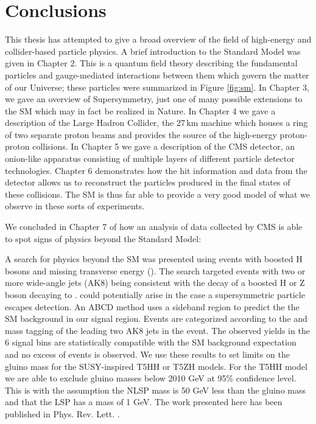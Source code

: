 \chapter{Conclusions}
\label{chap:conclusions}

This thesis has attempted to give a broad overview of the field of high-energy and collider-based particle physics. A brief introduction to the Standard Model was given in Chapter 2. This is a quantum field theory describing the fundamental particles and gauge-mediated interactions between them which govern the matter of our Universe; these particles were summarized in Figure \ref{fig:sm}. In Chapter 3, we gave an overview of Supersymmetry, just one of many possible extensions to the SM which may in fact be realized in Nature. In Chapter 4 we gave a description of the Large Hadron Collider, the 27$\,$km machine which houses a ring of two separate proton beams and provides the source of the high-energy proton-proton collisions. In Chapter 5 we gave a description of the CMS detector, an onion-like apparatus consisting of multiple layers of different particle detector technologies. Chapter 6 demonstrates how the hit information and data from the detector allows us to reconstruct the particles produced in the final states of these collisions. The SM is thus far able to provide a very good model of what we observe in these sorts of experiments.

We concluded in Chapter 7 of how an analysis of data collected by CMS is able to spot signs of physics beyond the Standard Model:

A search for physics beyond the SM was presented using events with boosted H bosons and missing transverse energy (\ptmiss). The search targeted events with two or more wide-angle jets (AK8) being consistent with the decay of a boosted H or Z boson decaying to \bbbar. \ptmiss could potentially arise in the case a supersymmetric particle escapes detection. An ABCD method uses a sideband region to predict the the SM background in our signal region. Events are categorized according to the \bbbar and mass tagging of the leading two AK8 jets in the event. The observed yields in the 6 signal bins are statistically compatible with the SM background expectation and no excess of events is observed. We use these results to set limits on the gluino mass for the SUSY-inspired T5HH or T5ZH models. For the T5HH model we are able to exclude gluino masses below 2010 GeV at 95\% confidence level. This is with the assumption the NLSP mass is 50 GeV less than the gluino mass and that the LSP has a mass of 1 GeV. The work presented here has been published in Phys. Rev. Lett. \cite{CMS-SUS-17-006}.
